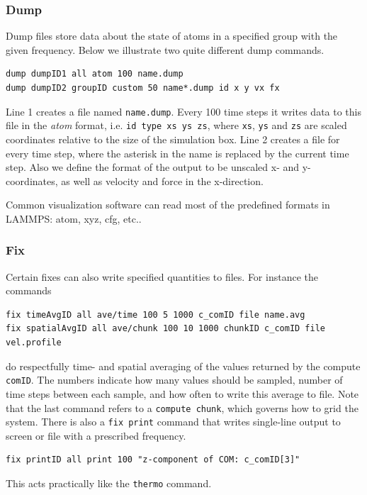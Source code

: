 \documentclass[twoside,english]{uiofysmaster}
\begin{document}
\subsubsection{Dump} 
Dump files  store data about the state of atoms in a specified group with the given frequency. 
Below we illustrate two quite different dump commands.
\begin{lstlisting}[language=LammpsInput]
dump dumpID1 all atom 100 name.dump
dump dumpID2 groupID custom 50 name*.dump id x y vx fx
\end{lstlisting} 
Line 1 creates a file named \texttt{name.dump}. Every 100 time steps it writes data to this file in the \textit{atom} format, i.e. \texttt{id type xs ys zs}, where \texttt{xs}, \texttt{ys} and \texttt{zs} are scaled coordinates relative to the size of the simulation box. 
Line 2 creates a file for every time step, where the asterisk in the name is replaced by the current time step. Also we define the format of the output to be unscaled x- and y-coordinates, as well as velocity and force in the x-direction. 
 
Common visualization software can read most of the predefined formats in LAMMPS: atom, xyz, cfg, etc..


\subsubsection{Fix} 
Certain fixes can also write specified quantities to files. For instance the commands 
\begin{lstlisting}[language=LammpsInput]
fix timeAvgID all ave/time 100 5 1000 c_comID file name.avg
fix spatialAvgID all ave/chunk 100 10 1000 chunkID c_comID file vel.profile
\end{lstlisting} 
do respectfully time- and spatial averaging of the values returned by the compute \texttt{comID}. The numbers indicate how many values should be sampled, number of time steps between each sample, and how often to write this average to file. Note that the last command refers to a \texttt{compute chunk}, which governs how to grid the system. 
There is also a \texttt{fix print} command that writes single-line output to screen or file with a prescribed frequency.
\begin{lstlisting}[language=LammpsInput]
fix printID all print 100 "z-component of COM: c_comID[3]" 
\end{lstlisting} 
This acts practically like the \texttt{thermo} command.
\end{document}
